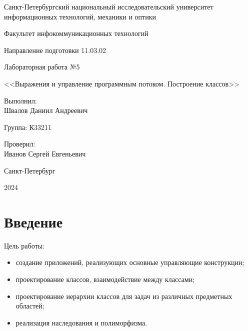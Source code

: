\documentclass[a4paper, 14pt]{extarticle}
\begin{document}
\begin{titlepage}
  \vspace{0pt plus2fill}
  \noindent

  \vspace{0pt plus6fill}
  \begin{center}
    Санкт-Петербургский национальный исследовательский университет
    информационных технологий, механики и оптики

    \vspace{0pt plus3fill}

    Факультет инфокоммуникационных технологий

    Направление подготовки 11.03.02

    \vspace{0pt plus2fill}

    Лабораторная работа №5

    <<Выражения и управление программным потоком. Построение классов>>

  \end{center}

  \vspace{0pt plus6fill}
  \begin{flushright}
    Выполнил: \\
    Швалов Даниил Андреевич

    Группа: К33211

    Проверил: \\
    Иванов Сергей Евгеньевич
  \end{flushright}

  \vspace{0pt plus5fill}
  \begin{center}
    Санкт-Петербург

    2024
  \end{center}
\end{titlepage}

\setcounter{page}{2}

\section*{Введение}

Цель работы:
\begin{itemize}
  \item создание приложений, реализующих основные управляющие конструкции;
  \item проектирование классов, взаимодействие между классами;
  \item проектирование иерархии классов для задач из различных предметных
  областей;
  \item реализация наследования и полиморфизма.
\end{itemize}
\end{document}
